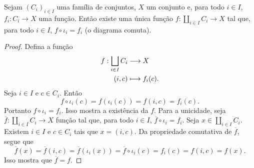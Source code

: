\begin{prop}
Sejam $(C_i)_{i \in I}$ uma família de conjuntos, $X$ um conjunto e, para todo $i \in I$, $f_i: C_i \to X$ uma função. Então existe uma única função $f: \coprod_{i \in I} C_i \to X$ tal que, para todo $i \in I$, $f \circ \iota_i = f_i$ (o diagrama comuta).
\begin{figure}
\centering
{}
\end{figure}
\end{prop}
\begin{proof}
Defina a função
	\begin{align*}
	{f}: {\bigsqcup_{i \in I} C_i} &\longrightarrow {X} \\{(i,c)} &\longmapsto {f_i(c)}.
	\end{align*}
Seja $i \in I$ e $c \in C_i$. Então
	\begin{equation*}
	f \circ \iota_i(c) = f(\iota_i(c)) = f(i,c) = f_i(c).
	\end{equation*}
Portanto $f \circ \iota_i = f_i$. Isso mostra a existência da $f$. Para a unicidade, seja $\overline{f}: \coprod_{i \in I} C_i \to X$ função tal que, para todo $i \in I$, $\overline{f} \circ \iota_i = f_i$. Seja $x \in \coprod_{i \in I} C_i$. Existem $i \in I$ e $c \in C_i$ tais que $x=(i,c)$. Da propriedade comutativa de $\overline{f}$, segue que
	\begin{equation*}
	\overline{f}(x) = \overline{f}(i,c) = \overline{f}(\iota_i(x)) = \overline{f} \circ \iota_i(c) = f_i(c) = f(i,c) = f(x).
	\end{equation*}
Isso mostra que $\overline{f}=f$.
\end{proof}







